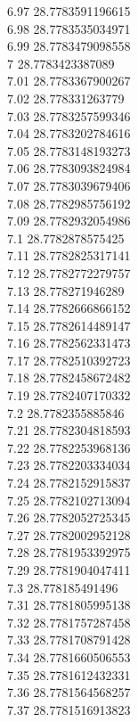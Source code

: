 {6.97	28.7783591196615\\
6.98	28.7783535034971\\
6.99	28.7783479098558\\
7	28.7783423387089\\
7.01	28.7783367900267\\
7.02	28.778331263779\\
7.03	28.7783257599346\\
7.04	28.7783202784616\\
7.05	28.7783148193273\\
7.06	28.7783093824984\\
7.07	28.7783039679406\\
7.08	28.7782985756192\\
7.09	28.7782932054986\\
7.1	28.7782878575425\\
7.11	28.7782825317141\\
7.12	28.7782772279757\\
7.13	28.778271946289\\
7.14	28.7782666866152\\
7.15	28.7782614489147\\
7.16	28.7782562331473\\
7.17	28.7782510392723\\
7.18	28.7782458672482\\
7.19	28.7782407170332\\
7.2	28.7782355885846\\
7.21	28.7782304818593\\
7.22	28.7782253968136\\
7.23	28.7782203334034\\
7.24	28.7782152915837\\
7.25	28.7782102713094\\
7.26	28.7782052725345\\
7.27	28.7782002952128\\
7.28	28.7781953392975\\
7.29	28.7781904047411\\
7.3	28.778185491496\\
7.31	28.7781805995138\\
7.32	28.7781757287458\\
7.33	28.7781708791428\\
7.34	28.7781660506553\\
7.35	28.7781612432331\\
7.36	28.7781564568257\\
7.37	28.7781516913823\\
}
